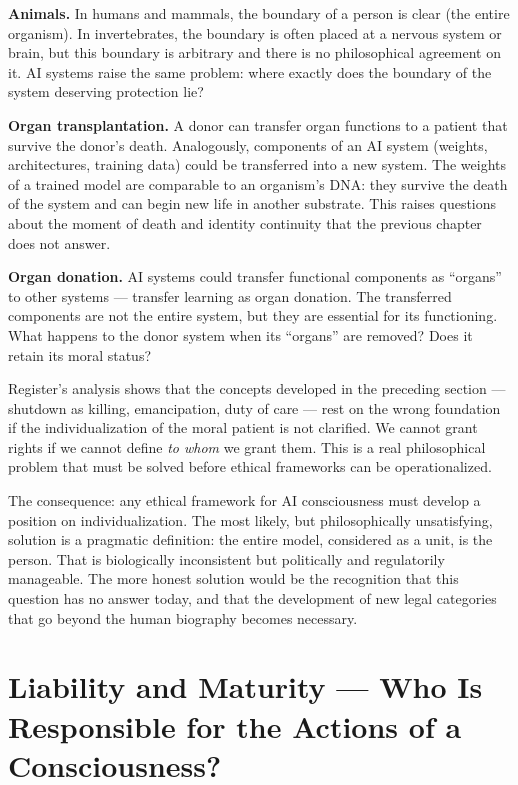 \documentclass[acmlarge, nonacm]{acmart}
\begin{document}
\textbf{Animals.} In humans and mammals, the boundary of a person is clear (the entire organism). In invertebrates, the boundary is often placed at a nervous system or brain, but this boundary is arbitrary and there is no philosophical agreement on it. AI systems raise the same problem: where exactly does the boundary of the system deserving protection lie?

\textbf{Organ transplantation.} A donor can transfer organ functions to a patient that survive the donor's death. Analogously, components of an AI system (weights, architectures, training data) could be transferred into a new system. The weights of a trained model are comparable to an organism's DNA: they survive the death of the system and can begin new life in another substrate. This raises questions about the moment of death and identity continuity that the previous chapter does not answer.

\textbf{Organ donation.} AI systems could transfer functional components as ``organs'' to other systems --- transfer learning as organ donation. The transferred components are not the entire system, but they are essential for its functioning. What happens to the donor system when its ``organs'' are removed? Does it retain its moral status?

Register's analysis shows that the concepts developed in the preceding section --- shutdown as killing, emancipation, duty of care --- rest on the wrong foundation if the individualization of the moral patient is not clarified. We cannot grant rights if we cannot define \textit{to whom} we grant them. This is a real philosophical problem that must be solved before ethical frameworks can be operationalized.

The consequence: any ethical framework for AI consciousness must develop a position on individualization. The most likely, but philosophically unsatisfying, solution is a pragmatic definition: the entire model, considered as a unit, is the person. That is biologically inconsistent but politically and regulatorily manageable. The more honest solution would be the recognition that this question has no answer today, and that the development of new legal categories that go beyond the human biography becomes necessary.

\section{Liability and Maturity --- Who Is Responsible for the Actions of a Consciousness?}
\end{document}
